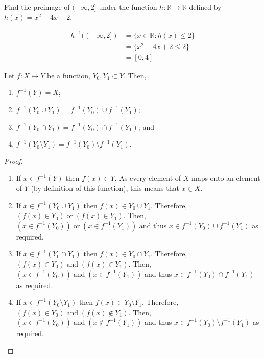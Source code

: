 \begin{example}
    Find the preimage of $(-\infty,2]$ under the function $h:\mathbb R\mapsto\mathbb R$ defined by $h(x)=x^2-4x+2$.
    
    \begin{align*}
        h^{-1}((-\infty,2])&=\{x\in\mathbb R:h(x)\leq2\}\\
        &=\{x^2-4x+2\leq2\}\\
        &=[0,4]
    \end{align*}
\end{example}

\begin{proposition}
    Let $f:X\mapsto Y$ be a function, $Y_0,Y_1\subset Y$. Then,
    \begin{enumerate}
        \item $f^{-1}(Y)=X$;
        \item $f^{-1}(Y_0\cup Y_1)=f^{-1}(Y_0)\cup f^{-1}(Y_1)$;
        \item $f^{-1}(Y_0\cap Y_1)=f^{-1}(Y_0)\cap f^{-1}(Y_1)$; and
        \item $f^{-1}(Y_0\setminus Y_1)=f^{-1}(Y_0)\setminus f^{-1}(Y_1)$.
    \end{enumerate}
\end{proposition}

\begin{proof}
    \begin{enumerate}
        \item If $x\in f^{-1}(Y)$ then $f(x)\in Y$. As every element of $X$ maps onto an element of $Y$ (by definition of this function), this means that $x\in X$.
        
        \item If $x\in f^{-1}(Y_0\cup Y_1)$ then $f(x)\in Y_0\cup Y_1$. Therefore, $(f(x)\in Y_0)\;\text{or}\;(f(x)\in Y_1)$. Then, $(x\in f^{-1}(Y_0))\;\text{or}\;(x\in f^{-1}(Y_1))$ and thus $x\in f^{-1}(Y_0)\cup f^{-1}(Y_1)$ as required.
        
        \item If $x\in f^{-1}(Y_0\cap Y_1)$ then $f(x)\in Y_0\cap Y_1$. Therefore, $(f(x)\in Y_0)\;\text{and}\;(f(x)\in Y_1)$. Then, $(x\in f^{-1}(Y_0))\;\text{and}\;(x\in f^{-1}(Y_1))$ and thus $x\in f^{-1}(Y_0)\cap f^{-1}(Y_1)$ as required.
        
        \item If $x\in f^{-1}(Y_0\setminus Y_1)$ then $f(x)\in Y_0\setminus Y_1$. Therefore, $(f(x)\in Y_0)\;\text{and}\;(f(x)\not\in Y_1)$. Then, $(x\in f^{-1}(Y_0))\;\text{and}\;(x\not\in f^{-1}(Y_1))$ and thus $x\in f^{-1}(Y_0)\setminus f^{-1}(Y_1)$ as required.
    \end{enumerate}
\end{proof}

